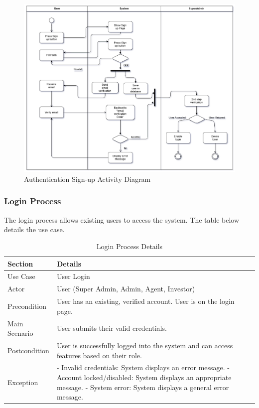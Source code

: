 \begin{figure}[ht!]
    \centering
    \includegraphics[width=1\textwidth]{images/signup_activitydiag.png}
    \caption{Authentication Sign-up Activity Diagram}
    \label{fig:signup-activity-diagram}
\end{figure}



\subsubsection{Login Process}
The login process allows existing users to access the system. The table below details the use case.

\begin{table}[htbp]
    \centering
    \begin{tabular}{|l|p{}|}
        \hline
        \textbf{Section} & \textbf{Details} \\
        \hline
        Use Case & User Login \\
        \hline
        Actor & User (Super Admin, Admin, Agent, Investor) \\
        \hline
        Precondition & User has an existing, verified account. User is on the login page. \\
        \hline
        Main Scenario & 
        User submits their valid credentials. \\
        \hline
        Postcondition & User is successfully logged into the system and can access features based on their role. \\
        \hline
        Exception & 
        - Invalid credentials: System displays an error message.
        - Account locked/disabled: System displays an appropriate message.
        - System error: System displays a general error message. \\
        \hline
    \end{tabular}
    \caption{Login Process Details}
    \label{tab:login_process}
\end{table}

